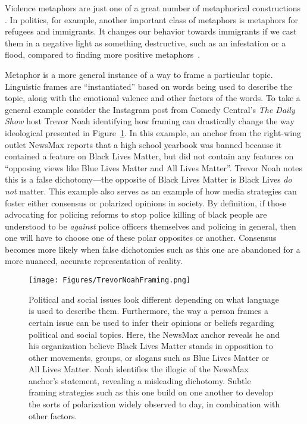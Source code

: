 \documentclass[12pt,letterpaper]{article}
\begin{document}
Violence metaphors are just one of a great number of metaphorical constructions
\cite{Goldberg2003,Goldberg2006,Dodge2015}. 
In politics, for example, another important class of metaphors is
metaphors for refugees and immigrants. It changes our behavior towards 
immigrants if we cast them in a negative light as something destructive, 
such as an infestation or a flood, compared to finding more positive 
metaphors~\cite{OBrien2003,Cisneros2008}.

Metaphor is a more general instance of a way to frame a particular topic. 
Linguistic frames are ``instantiated'' based on words being used to describe the
topic, along with the emotional valence and other factors of the words. To take
a general example consider the Instagram post from Comedy Central's 
\emph{The Daily Show} host Trevor Noah identifying how
framing can drastically change the way ideological presented in Figure~\ref{fig:TrevorNoahFraming}. In this example, an anchor from the right-wing outlet NewsMax
reports that a high school yearbook was banned because it contained a feature
on Black Lives Matter, but did not contain any features on ``opposing views
like Blue Lives Matter and All Lives Matter''. Trevor Noah notes this is a 
false dichotomy---the opposite of Black Lives Matter is Black Lives \emph{do not}
matter. This example also serves as an example of how media strategies can 
foster either consensus or polarized opinions in society. By definition, if
those advocating for policing reforms to stop police killing of black people
are understood to be \emph{against} police officers themselves and policing
in general, then one will have to choose one of these polar opposites or 
another. Consensus becomes more likely when false dichotomies such as this one
are abandoned for a more nuanced, accurate representation of reality.

\begin{figure}
  \centering
    \texttt{[image: Figures/TrevorNoahFraming.png]}
  \caption{Political and social issues look different depending on what language
is used to describe them. Furthermore, the way a person frames a certain issue
can be used to infer their opinions or beliefs regarding political and social
topics. Here, the NewsMax anchor reveals he and his organization believe 
Black Lives Matter stands in opposition to other movements, groups, or 
slogans such as Blue Lives Matter or All Lives Matter. Noah identifies the
illogic of the NewsMax anchor's statement, revealing a misleading dichotomy.
Subtle framing strategies such as this one build on one another to develop
the sorts of polarization widely observed to day, in combination with other
factors.}
\label{fig:TrevorNoahFraming}
\end{figure}
\end{document}
